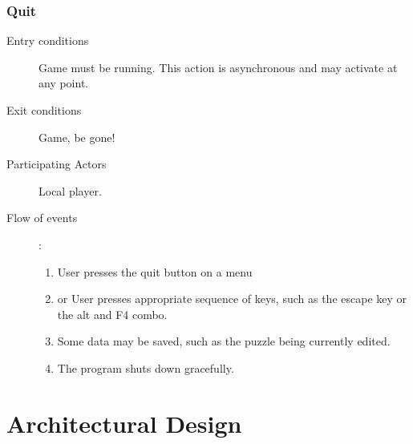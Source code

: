 \documentclass[12pt]{article}
\begin{document}
\begin{mdframed}
    \subsubsection{Quit}
    \begin{description}
        \item[Entry conditions] Game must be running. This action is
            asynchronous and may activate at any point.
        \item[Exit conditions] Game, be gone!
        \item[Participating Actors] Local player.
        \item[Flow of events]:
            \begin{enumerate}
                \item User presses the quit button on a menu
                \item or User presses appropriate sequence of keys, such as
                    the escape key or the alt and F4 combo.
                \item Some data may be saved, such as the puzzle being currently 
                edited.
                \item The program shuts down gracefully.
            \end{enumerate}
    \end{description}
\end{mdframed}



\section{Architectural Design}
\end{document}
